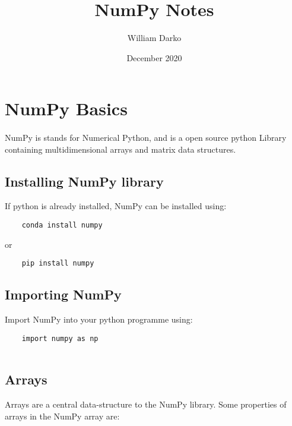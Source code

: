 \documentclass[12pt, a4paper]{article}
\title{NumPy Notes}
\author{William Darko}
\date{December 2020}
\begin{document}
\maketitle
\newpage

\tableofcontents

\newpage

\section{NumPy Basics}
\paragraph*{}
NumPy is stands for Numerical Python, and is a open source python Library containing multidimensional arrays and matrix data structures.

\subsection{Installing NumPy library}

If python is already installed, NumPy can be installed using:
\newline

\begin{lstlisting}
    conda install numpy
\end{lstlisting}

or

\begin{lstlisting}
    pip install numpy
\end{lstlisting}


\subsection{Importing NumPy}

Import NumPy into your python programme using:
\newline

\begin{lstlisting}
    import numpy as np
    
\end{lstlisting}


\subsection{Arrays}
Arrays are a central data-structure to the NumPy library. Some properties of arrays in the NumPy array are:
\end{document}
